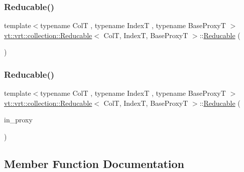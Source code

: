 \subsubsection{\texorpdfstring{Reducable()}{Reducable()}\hspace{0.1cm}{\footnotesize\ttfamily [3/4]}}
{\footnotesize\ttfamily template$<$typename ColT , typename IndexT , typename Base\+ProxyT $>$ \\
\hyperlink{structvt_1_1vrt_1_1collection_1_1_reducable}{vt\+::vrt\+::collection\+::\+Reducable}$<$ ColT, IndexT, Base\+ProxyT $>$\+::\hyperlink{structvt_1_1vrt_1_1collection_1_1_reducable}{Reducable} (\begin{DoxyParamCaption}\item[{\hyperlink{structvt_1_1vrt_1_1collection_1_1_reducable}{Reducable}$<$ ColT, IndexT, Base\+ProxyT $>$ \&\&}]{ }\end{DoxyParamCaption})\hspace{0.3cm}{\ttfamily [default]}}

\mbox{\label{structvt_1_1vrt_1_1collection_1_1_reducable_a658b587cdafda69c95ad0a2efe7a73fe}} 
\subsubsection{\texorpdfstring{Reducable()}{Reducable()}\hspace{0.1cm}{\footnotesize\ttfamily [4/4]}}
{\footnotesize\ttfamily template$<$typename ColT , typename IndexT , typename Base\+ProxyT $>$ \\
\hyperlink{structvt_1_1vrt_1_1collection_1_1_reducable}{vt\+::vrt\+::collection\+::\+Reducable}$<$ ColT, IndexT, Base\+ProxyT $>$\+::\hyperlink{structvt_1_1vrt_1_1collection_1_1_reducable}{Reducable} (\begin{DoxyParamCaption}\item[{\hyperlink{namespacevt_a1b417dd5d684f045bb58a0ede70045ac}{Virtual\+Proxy\+Type} const}]{in\+\_\+proxy }\end{DoxyParamCaption})\hspace{0.3cm}{\ttfamily [explicit]}}



\subsection{Member Function Documentation}
\mbox{\label{structvt_1_1vrt_1_1collection_1_1_reducable_a7df8661d0e353935f034c4c0174c0872}} 
